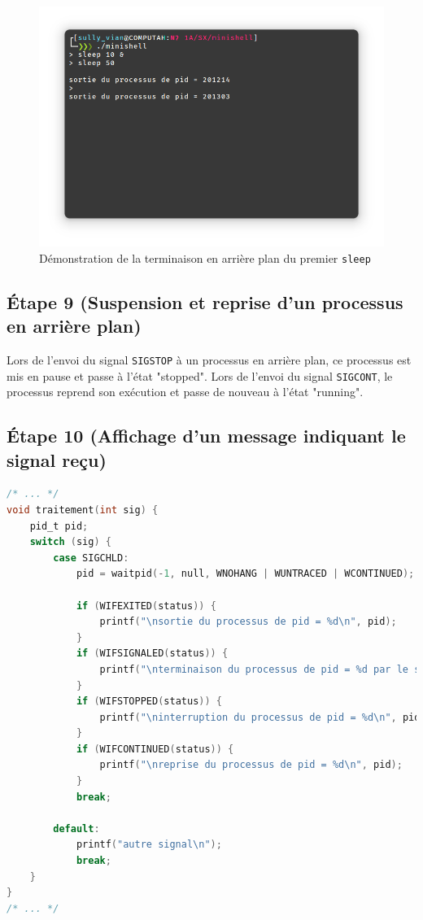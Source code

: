 \documentclass{article}
\begin{document}
\begin{figure}[H]
    \centering
    \includegraphics[width=\textwidth]{./resources/E8.png}
    \caption{Démonstration de la terminaison en arrière plan du premier \texttt{sleep}}
\end{figure}

\subsection*{Étape 9 (Suspension et reprise d'un processus en arrière plan)}

Lors de l'envoi du signal \texttt{SIGSTOP} à un processus en arrière plan, ce processus est mis en pause et passe à l'état "stopped". Lors de l'envoi du signal \texttt{SIGCONT}, le processus reprend son exécution et passe de nouveau à l'état "running".

\subsection*{Étape 10 (Affichage d'un message indiquant le signal reçu)}

\begin{lstlisting}[language=C, caption=ajout de la question 10]
/* ... */
void traitement(int sig) {
    pid_t pid;
    switch (sig) {
        case SIGCHLD:
            pid = waitpid(-1, null, WNOHANG | WUNTRACED | WCONTINUED);

            if (WIFEXITED(status)) {
                printf("\nsortie du processus de pid = %d\n", pid);
            }
            if (WIFSIGNALED(status)) {
                printf("\nterminaison du processus de pid = %d par le signal %d\n", pid, sig);
            }
            if (WIFSTOPPED(status)) {
                printf("\ninterruption du processus de pid = %d\n", pid);
            }
            if (WIFCONTINUED(status)) {
                printf("\nreprise du processus de pid = %d\n", pid);
            }
            break;

        default:
            printf("autre signal\n");
            break;
    }
}
/* ... */
\end{lstlisting}
\end{document}
